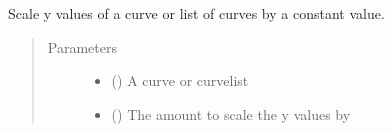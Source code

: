 \documentclass[letterpaper,10pt,english]{sphinxmanual}
\begin{document}

\begin{fulllineitems}
\label{\detokenize{pydv:pydvpy.my}}
Scale y values of a curve or list of curves by a constant value.

\begin{sphinxVerbatim}[commandchars=\\\{\}]
  
\end{sphinxVerbatim}

\begin{sphinxVerbatim}[commandchars=\\\{\}]
  
\end{sphinxVerbatim}

\begin{sphinxVerbatim}[commandchars=\\\{\}]
\PYG{p}{[}\PYG{p}{]} 
\end{sphinxVerbatim}
\begin{quote}\begin{description}
\item[{Parameters}] \leavevmode\begin{itemize}
\item {} 
 ({\hyperref[\detokenize{pydv:curve.Curve}]{}}) \textendash{} A curve or curvelist

\item {} 
 () \textendash{} The amount to scale the y values by

\end{itemize}

\end{description}\end{quote}

\end{fulllineitems}
\end{document}
